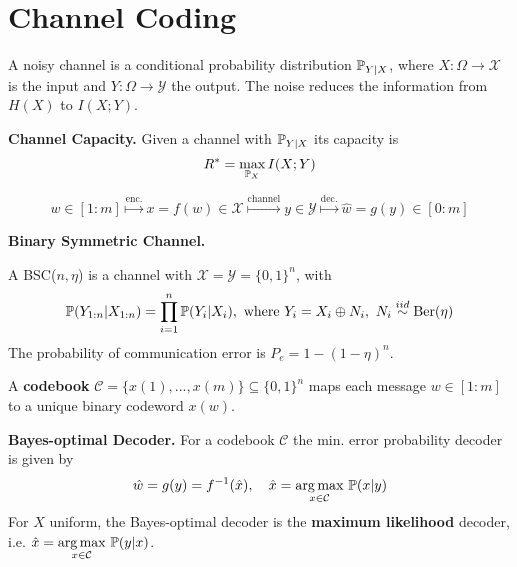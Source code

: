 \section{Channel Coding}

A noisy channel is a conditional probability distribution \(\P_{Y|X}\), 
where \(X: \Omega \to \mathcal{X}\) is the input and \(Y: \Omega \to \mathcal{Y}\) the output. 
The noise reduces the information from \(H(X)\) to \(I(X;Y)\).

\textbf{Channel Capacity.} Given a channel with \(\P_{Y|X}\) its capacity is
\[R^* = \max_{\P_X} I(X;Y)\]

\[w \in [1:m] \overset{\text{enc.}}{\mapsto} x = f(w) \in \mathcal{X} \overset{\text{channel}}{\mapsto} 
y \in \mathcal{Y} \overset{\text{dec.}}{\mapsto} \hat{w} = g(y) \in [0:m]\]

\textbf{Binary Symmetric Channel.}

A BSC(\(n, \eta\)) is a channel with \(\mathcal{X} = \mathcal{Y} = \{0, 1\}^n\), with 
\[\P(Y_{1:n}|X_{1:n}) = \prod_{i = 1}^n \P(Y_i|X_i), \ \text{where } Y_i = X_i \oplus N_i, \ N_i \overset{iid}{\sim}\text{Ber}(\eta)\]
The probability of communication error is \(P_e = 1 - (1- \eta)^n\).

A \textbf{codebook} \(\mathcal{C} = \{x(1), ..., x(m)\} \subseteq \{0, 1\}^n\) 
maps each message \(w \in [1:m]\) to a unique binary codeword \(x(w)\). 

\textbf{Bayes-optimal Decoder.} For a codebook \(\mathcal{C}\) the min. error probability decoder is given by
\[\hat{w} = g(y) = f^{-1}(\hat{x}), \quad \hat{x} = \underset{x \in \mathcal{C}}{\arg \max} \ \P(x | y)\]
For \(X\) uniform, the Bayes-optimal decoder is the \textbf{maximum likelihood} decoder, 
i.e. \(\hat{x} = \underset{x \in \mathcal{C}}{\arg \max} \ \P(y | x)\).

